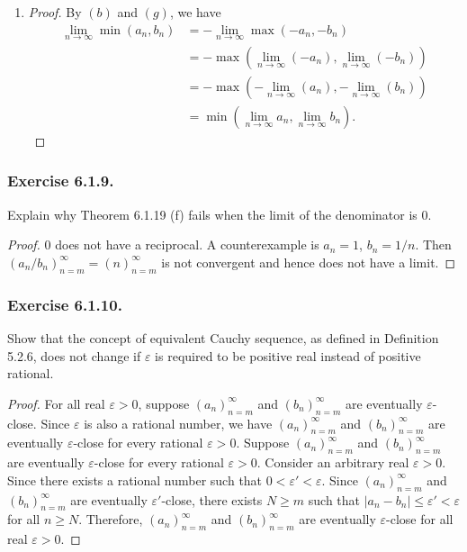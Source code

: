 \documentclass[12pt, letter]{article}
\newcommand{\an}{(a_n)_{n=m}^\infty}
\newcommand{\bn}{(b_n)_{n=m}^\infty}
\begin{document}
\begin{enumerate}[label=(\alph*)]
\begin{proof}
        Similarly, we can show that if $y>x$, there exists $M\geq m$ such that $|\max(a_n,b_n)-\max(x,y)|=|b_n-y|\leq \varepsilon$ for all $n\geq M$. Thus, $(\max(a_n,b_n))_{n=m}^\infty$ converges to $\max(x,y)$.
    \end{proof}
    \item \begin{proof}
        By $(b)$ and $(g)$, we have 
        \begin{equation*}
            \begin{aligned}
                \lim_{n\to\infty}\min(a_n,b_n)&=-\lim_{n\to\infty}\max(-a_n,-b_n)\\
                &=-\max(\lim_{n\to\infty}(-a_n),\lim_{n\to\infty}(-b_n))\\
                &=-\max(-\lim_{n\to\infty}(a_n),-\lim_{n\to\infty}(b_n))\\
                &=\min(\lim_{n\to\infty}a_n,\lim_{n\to\infty}b_n).
            \end{aligned}
        \end{equation*}
    \end{proof}
\end{enumerate}
\subsubsection*{Exercise 6.1.9.}
Explain why Theorem 6.1.19 (f) fails when the limit of the denominator is 0.
\begin{proof}
    0 does not have a reciprocal. A counterexample is $a_n=1$, $b_n=1/n$. Then $(a_n/b_n)_{n=m}^\infty=(n)_{n=m}^\infty$ is not convergent and hence does not have a limit. 
\end{proof}
\subsubsection*{Exercise 6.1.10.}
Show that the concept of equivalent Cauchy sequence, as defined in Definition 5.2.6, does not change if $\varepsilon$ is required to be positive real instead of positive rational.
\begin{proof}
    For all real $\varepsilon>0$, suppose $\an$ and $\bn$ are eventually $\varepsilon$-close. Since $\varepsilon$ is also a rational number, we have $\an$ and $\bn$ are eventually $\varepsilon$-close for every rational $\varepsilon>0$.
    Suppose $\an$ and $\bn$ are eventually $\varepsilon$-close for every rational $\varepsilon>0$. Consider an arbitrary real $\varepsilon>0$. Since there exists a rational number such that $0<\varepsilon'<\varepsilon$.
    Since $\an$ and $\bn$ are eventually $\varepsilon'$-close, there exists $N\geq m$ such that $|a_n-b_n|\leq\varepsilon'<\varepsilon$ for all $n\geq N$. Therefore, $\an$ and $\bn$
    are eventually $\varepsilon$-close for all real $\varepsilon>0$. 
\end{proof}
\end{document}
